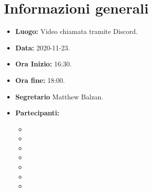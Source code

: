   \section{Informazioni generali}
	\begin{itemize}
		\item \textbf{Luogo:} Video chiamata tramite Discord.
		\item \textbf{Data:} 2020-11-23.
		\item \textbf{Ora Inizio:} 16:30.
		\item \textbf{Ora fine:} 18:00.
		\item \textbf{Segretario} Matthew Balzan.
		\item \textbf{Partecipanti:}
		\begin{itemize}
			\item \MB
			\item \VAS
			\item \FD
			\item \NM
			\item \SB
			\item \GB
			\item \MDI
		\end{itemize}
		
	\end{itemize}